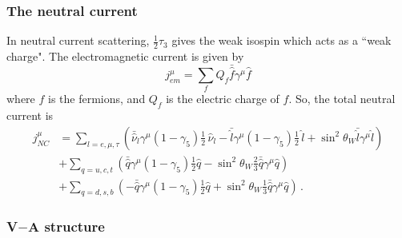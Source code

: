   \subsubsection{The neutral current}
  In neutral current scattering, $\frac{1}{2}\tau_3$ gives the weak isospin
  which acts as a ``weak charge". The electromagnetic current is given by
  \begin{equation}
      j^{\mu}_{em} = \sum_f Q_f \bar{\hat{f}} \gamma^{\mu} \hat{f}
  \end{equation}
  where $f$ is the fermions, and $Q_f$ is the electric charge of $f$.
  So, the total neutral current is
  \begin{equation}
    \begin{aligned}
        j^{\mu}_{NC} &= \sum_{l=e,\mu,\tau} \left(\bar{\hat{\nu}}_{l}
        \gamma^{\mu}(1-\gamma_5) \frac{1}{2}\, \hat{\nu}_{l} - \bar{\hat{l}}
        \gamma^{\mu}(1-\gamma_5) \frac{1}{2}\, \hat{l} 
        +\sin^2\theta_W \bar{\hat{l}}\gamma^{\mu}\hat{l} \right) \\
        &+ \sum_{q=u,c,t} \left(\bar{\hat{q}} \gamma^{\mu}(1-\gamma_5)\frac{1}{2}\hat{q} 
        - \sin^2\theta_W \frac{2}{3} \bar{\hat{q}}\gamma^{\mu}\hat{q} \right) \\
        &+ \sum_{q=d,s,b} \left(- \bar{\hat{q}} \gamma^{\mu}(1-\gamma_5)\frac{1}{2}\hat{q} 
        + \sin^2\theta_W \frac{1}{3} \bar{\hat{q}}\gamma^{\mu}\hat{q} \right) \,.
     \end{aligned}
  \end{equation}
 
  \subsubsection{V$-$A structure}

